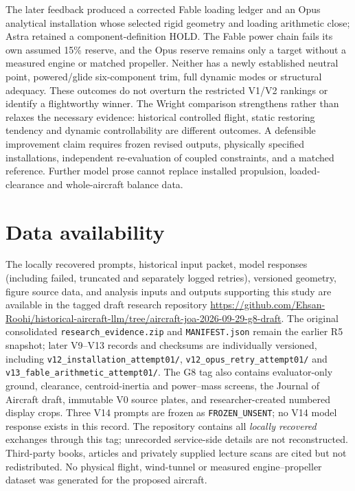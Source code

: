 \documentclass[10pt,letterpaper]{article}
\begin{document}
The later feedback produced a corrected Fable loading ledger and an Opus analytical installation whose selected rigid geometry and loading arithmetic close; Astra retained a component-definition HOLD. The Fable power chain fails its own assumed 15\% reserve, and the Opus reserve remains only a target without a measured engine or matched propeller. Neither has a newly established neutral point, powered/glide six-component trim, full dynamic modes or structural adequacy. These outcomes do not overturn the restricted V1/V2 rankings or identify a flightworthy winner. The Wright comparison strengthens rather than relaxes the necessary evidence: historical controlled flight, static restoring tendency and dynamic controllability are different outcomes. A defensible improvement claim requires frozen revised outputs, physically specified installations, independent re-evaluation of coupled constraints, and a matched reference. Further model prose cannot replace installed propulsion, loaded-clearance and whole-aircraft balance data.

\section*{Data availability}
The locally recovered prompts, historical input packet, model responses (including failed, truncated and separately logged retries), versioned geometry, figure source data, and analysis inputs and outputs supporting this study are available in the tagged draft research repository \url{https://github.com/Ehsan-Roohi/historical-aircraft-llm/tree/aircraft-joa-2026-09-29-g8-draft}. The original consolidated \texttt{research\_evidence.zip} and \texttt{MANIFEST.json} remain the earlier R5 snapshot; later V9--V13 records and checksums are individually versioned, including \texttt{v12\_installation\_attempt01/}, \texttt{v12\_opus\_retry\_attempt01/} and \texttt{v13\_fable\_arithmetic\_attempt01/}. The G8 tag also contains evaluator-only ground, clearance, centroid-inertia and power--mass screens, the Journal of Aircraft draft, immutable V0 source plates, and researcher-created numbered display crops. Three V14 prompts are frozen as \texttt{FROZEN\_UNSENT}; no V14 model response exists in this record. The repository contains all \emph{locally recovered} exchanges through this tag; unrecorded service-side details are not reconstructed. Third-party books, articles and privately supplied lecture scans are cited but not redistributed. No physical flight, wind-tunnel or measured engine--propeller dataset was generated for the proposed aircraft.
\end{document}
